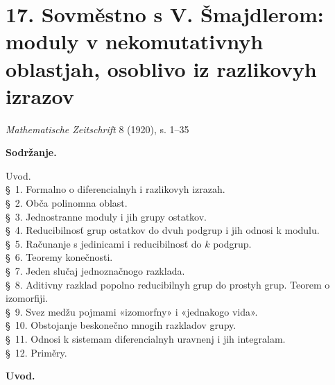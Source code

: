 \documentclass[11pt]{article}
\begin{document}

\setcounter{footnote}{0}
\section*{17. Sovměstno s V. Šmajdlerom: moduly v nekomutativnyh oblastjah, osoblivo iz razlikovyh izrazov}
\begin{center}
\emph{Mathematische Zeitschrift} 8 (1920), s. 1--35
\end{center}

\begin{center}
\textbf{Sodržanje.}
\end{center}
\begin{center}
\begin{minipage}{0.88\linewidth}
Uvod.\\
\S~1. Formalno o diferencialnyh i razlikovyh izrazah.\\
\S~2. Obča polinomna oblast.\\
\S~3. Jednostranne moduly i jih grupy ostatkov.\\
\S~4. Reducibilnosť grup ostatkov do dvuh podgrup i jih odnosi k modulu.\\
\S~5. Računanje s jedinicami i reducibilnosť do \(k\) podgrup.\\
\S~6. Teoremy konečnosti.\\
\S~7. Jeden slučaj jednoznačnogo razklada.\\
\S~8. Aditivny razklad popolno reducibilnyh grup do prostyh grup. Teorem o izomorfiji.\\
\S~9. Svez medžu pojmami «izomorfny» i «jednakogo vida».\\
\S~10. Obstojanje beskonečno mnogih razkladov grupy.\\
\S~11. Odnosi k sistemam diferencialnyh uravnenj i jih integralam.\\
\S~12. Priměry.
\end{minipage}
\end{center}

\begin{center}\textbf{Uvod.}\end{center}
\end{document}
